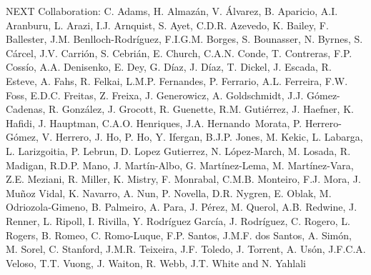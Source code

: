 NEXT Collaboration: C. Adams, H. Almaz\'an, V. \'Alvarez, B. Aparicio, A.I. Aranburu, L. Arazi, I.J. Arnquist, S. Ayet, C.D.R. Azevedo, K. Bailey, F. Ballester, J.M. Benlloch-Rodr\'{i}guez, F.I.G.M. Borges, S. Bounasser, N. Byrnes, S. C\'arcel, J.V. Carri\'on, S. Cebri\'an, E. Church, C.A.N. Conde, T. Contreras, F.P. Coss\'io, A.A. Denisenko, E. Dey, G. D\'iaz, J. D\'iaz, T. Dickel, J. Escada, R. Esteve, A. Fahs, R. Felkai, L.M.P. Fernandes, P. Ferrario, A.L. Ferreira, F.W. Foss, E.D.C. Freitas, Z. Freixa, J. Generowicz, A. Goldschmidt, J.J. G\'omez-Cadenas, R. Gonz\'alez, J. Grocott, R. Guenette, R.M. Guti\'errez, J. Haefner, K. Hafidi, J. Hauptman, C.A.O. Henriques, J.A. Hernando~Morata, P. Herrero-G\'omez, V. Herrero, J. Ho, P. Ho, Y. Ifergan, B.J.P. Jones, M. Kekic, L. Labarga, L. Larizgoitia, P. Lebrun, D. Lopez Gutierrez, N. L\'opez-March, M. Losada, R. Madigan, R.D.P. Mano, J. Mart\'in-Albo, G. Mart\'inez-Lema, M. Mart\'inez-Vara, Z.E. Meziani, R. Miller, K. Mistry, F. Monrabal, C.M.B. Monteiro, F.J. Mora, J. Mu\~noz Vidal, K. Navarro, A. Nun, P. Novella, D.R. Nygren, E. Oblak, M. Odriozola-Gimeno, B. Palmeiro, A. Para, J. P\'erez, M. Querol, A.B. Redwine, J. Renner, L. Ripoll, I. Rivilla, Y. Rodr\'iguez Garc\'ia, J. Rodr\'iguez, C. Rogero, L. Rogers, B. Romeo, C. Romo-Luque, F.P. Santos, J.M.F. dos Santos, A. Sim\'on, M. Sorel, C. Stanford, J.M.R. Teixeira, J.F. Toledo, J. Torrent, A. Us\'on, J.F.C.A. Veloso, T.T. Vuong, J. Waiton, R. Webb, J.T. White and N. Yahlali